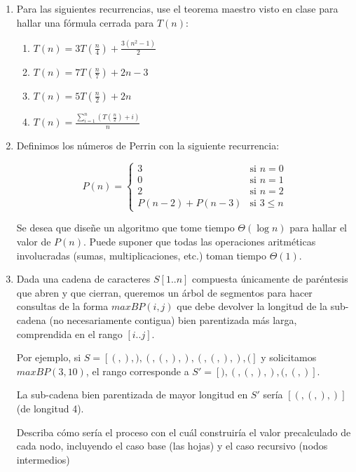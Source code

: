\documentclass[letterpaper, 12pt]{article}
\begin{document}
\begin{enumerate}


\item Para las siguientes recurrencias, use el teorema maestro visto en clase para
hallar una fórmula cerrada para $T(n)$:

\begin{enumerate}
    \item $T(n) = 3T(\frac{n}{4}) + \frac{3(n^2 - 1)}{2}$
    \item $T(n) = 7T(\frac{n}{7}) + 2n - 3$
    \item $T(n) = 5T(\frac{n}{2}) + 2n$
    \item $T(n) = \frac{\sum_{i=1}^n (T(\frac{n}{2}) + i)}{n}$
\end{enumerate}


\item Definimos los números de Perrin con la siguiente recurrencia:

\[
P(n) =
\begin{cases}
    3 & \text{si } n = 0 \\
    0 & \text{si } n = 1 \\
    2 & \text{si } n = 2 \\
    P(n - 2) + P(n - 3) & \text{si } 3 \leq n
\end{cases}
\]

Se desea que diseñe un algoritmo que tome tiempo $\Theta(\log n)$ para hallar el valor de $P(n)$. Puede suponer que todas las operaciones aritméticas involucradas (sumas, multiplicaciones, etc.) toman tiempo $\Theta(1)$.



\item Dada una cadena de caracteres $S[1..n]$ compuesta únicamente de paréntesis que abren y que cierran, queremos un árbol de segmentos para hacer consultas de la forma $maxBP(i, j)$ que debe devolver la longitud de la sub-cadena (no necesariamente contigua) bien parentizada más larga, comprendida en el rango $[i..j]$.

Por ejemplo, si $S = [(, ), ), (, (, ), ), (, (, ), ), (]$ y solicitamos $maxBP(3, 10)$, el rango corresponde a $S' = [), (, (, ), ), (, (, )]$.

La sub-cadena bien parentizada de mayor longitud en $S'$ sería $[(, (, ), )]$ (de longitud 4).

Describa cómo sería el proceso con el cuál construiría el valor precalculado de cada nodo,
incluyendo el caso base (las hojas) y el caso recursivo (nodos intermedios)


\end{enumerate} \vspace{4mm}
\end{document}
